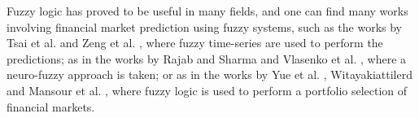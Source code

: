 ﻿\documentclass{ieeeaccess}
\begin{document}
Fuzzy logic has proved to be useful in many fields, and one can find
many works involving financial market prediction using fuzzy systems,
such as the works by Tsai et al. \cite{Tsai2019} and Zeng et
al. \cite{Zeng2019}, where fuzzy time-series are used to perform the
predictions; as in the works by Rajab and Sharma \cite{Rajab2019} and
Vlasenko et al. \cite{Vlasenko2019}, where a neuro-fuzzy approach is
taken; or as in the works by Yue et al. \cite{Yue2019},
Witayakiattilerd \cite{Witayakiattilerd2019} and Mansour et
al. \cite{Mansour2019}, where fuzzy logic is used to perform a
portfolio selection of financial markets.
\end{document}
